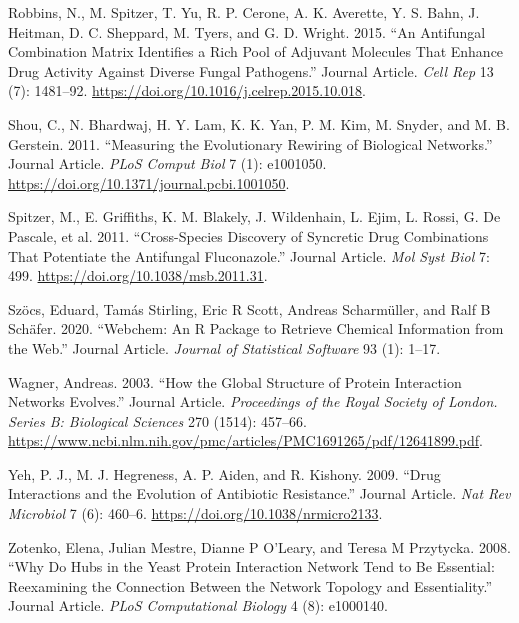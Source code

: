 \documentclass[]{elsarticle} %
\begin{document}
\leavevmode\hypertarget{ref-Robbins2015}{}%
Robbins, N., M. Spitzer, T. Yu, R. P. Cerone, A. K. Averette, Y. S. Bahn, J. Heitman, D. C. Sheppard, M. Tyers, and G. D. Wright. 2015. ``An Antifungal Combination Matrix Identifies a Rich Pool of Adjuvant Molecules That Enhance Drug Activity Against Diverse Fungal Pathogens.'' Journal Article. \emph{Cell Rep} 13 (7): 1481--92. \url{https://doi.org/10.1016/j.celrep.2015.10.018}.

\leavevmode\hypertarget{ref-Shou2011}{}%
Shou, C., N. Bhardwaj, H. Y. Lam, K. K. Yan, P. M. Kim, M. Snyder, and M. B. Gerstein. 2011. ``Measuring the Evolutionary Rewiring of Biological Networks.'' Journal Article. \emph{PLoS Comput Biol} 7 (1): e1001050. \url{https://doi.org/10.1371/journal.pcbi.1001050}.

\leavevmode\hypertarget{ref-Spitzer2011}{}%
Spitzer, M., E. Griffiths, K. M. Blakely, J. Wildenhain, L. Ejim, L. Rossi, G. De Pascale, et al. 2011. ``Cross-Species Discovery of Syncretic Drug Combinations That Potentiate the Antifungal Fluconazole.'' Journal Article. \emph{Mol Syst Biol} 7: 499. \url{https://doi.org/10.1038/msb.2011.31}.

\leavevmode\hypertarget{ref-Szocs2020}{}%
Szöcs, Eduard, Tamás Stirling, Eric R Scott, Andreas Scharmüller, and Ralf B Schäfer. 2020. ``Webchem: An R Package to Retrieve Chemical Information from the Web.'' Journal Article. \emph{Journal of Statistical Software} 93 (1): 1--17.

\leavevmode\hypertarget{ref-Wagner2003}{}%
Wagner, Andreas. 2003. ``How the Global Structure of Protein Interaction Networks Evolves.'' Journal Article. \emph{Proceedings of the Royal Society of London. Series B: Biological Sciences} 270 (1514): 457--66. \url{https://www.ncbi.nlm.nih.gov/pmc/articles/PMC1691265/pdf/12641899.pdf}.

\leavevmode\hypertarget{ref-Yeh2009}{}%
Yeh, P. J., M. J. Hegreness, A. P. Aiden, and R. Kishony. 2009. ``Drug Interactions and the Evolution of Antibiotic Resistance.'' Journal Article. \emph{Nat Rev Microbiol} 7 (6): 460--6. \url{https://doi.org/10.1038/nrmicro2133}.

\leavevmode\hypertarget{ref-Zotenko2008}{}%
Zotenko, Elena, Julian Mestre, Dianne P O'Leary, and Teresa M Przytycka. 2008. ``Why Do Hubs in the Yeast Protein Interaction Network Tend to Be Essential: Reexamining the Connection Between the Network Topology and Essentiality.'' Journal Article. \emph{PLoS Computational Biology} 4 (8): e1000140.
\end{document}
